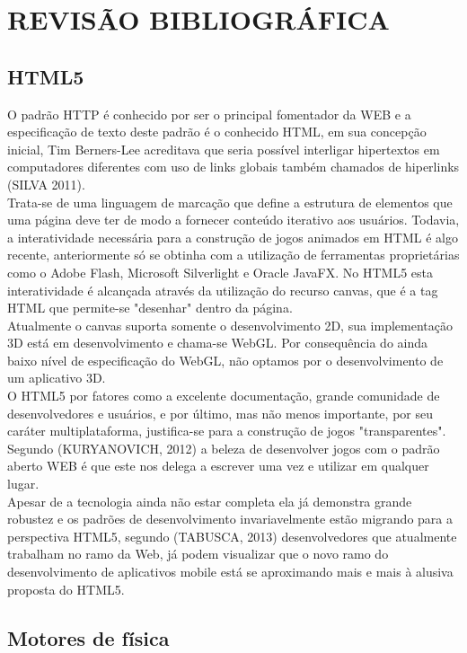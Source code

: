 \documentclass{article}
\begin{document}
\section{REVISÃO BIBLIOGRÁFICA}
\subsection{HTML5}
O padrão HTTP é conhecido por ser o principal fomentador da WEB e a especificação de texto deste padrão é o conhecido HTML, em sua concepção inicial, Tim Berners-Lee acreditava que seria possível  interligar hipertextos em computadores diferentes com uso de links globais também chamados de hiperlinks (SILVA 2011). 
\\
	Trata-se de uma linguagem de marcação que define a estrutura de elementos que uma página deve ter de modo a fornecer conteúdo iterativo aos usuários. Todavia, a interatividade necessária para a construção de jogos animados em HTML é algo recente, anteriormente só se obtinha com a utilização de ferramentas proprietárias como o Adobe Flash, Microsoft Silverlight e Oracle JavaFX. No HTML5 esta interatividade é alcançada através da utilização do recurso canvas, que é a tag HTML que permite-se "desenhar" dentro da página. 
\\
	Atualmente o canvas suporta somente o desenvolvimento 2D, sua implementação 3D está em desenvolvimento e chama-se WebGL. Por consequência do ainda baixo nível de especificação do WebGL, não optamos por o desenvolvimento de um aplicativo 3D. 
\\
	O HTML5 por fatores como a excelente documentação, grande comunidade de desenvolvedores e usuários, e por último, mas não menos importante, por seu caráter multiplataforma, justifica-se para a construção de jogos "transparentes". Segundo (KURYANOVICH, 2012) a beleza de desenvolver jogos com o padrão aberto WEB é que este nos delega a escrever uma vez e utilizar em qualquer lugar. 
\\

	Apesar de a tecnologia  ainda não estar completa ela já demonstra grande robustez  e os padrões de desenvolvimento invariavelmente estão migrando para a perspectiva HTML5, segundo (TABUSCA, 2013) desenvolvedores que atualmente trabalham no ramo da Web, já podem visualizar que o novo ramo do desenvolvimento de aplicativos mobile está se aproximando mais e mais à alusiva proposta do HTML5. \subsection{Motores de física}
\\
\end{document}
